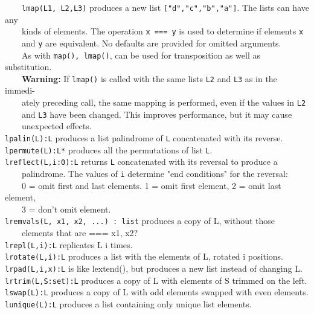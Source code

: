  \ \ \ \ \texttt{lmap(L1, L2,L3)} produces a new list
\texttt{["d","c","b","a"]}.
The lists can have any\\
 \ \ \ \ kinds of elements. The operation \texttt{x === y} is used to
determine if elements \texttt{x}\\
 \ \ \ \ and \texttt{y} are equivalent. No defaults are provided for omitted arguments.\\
 \ \ \ \ As
with \texttt{map(), lmap()}, can be used for transposition as well as substitution.\\
 \ \ \ \ \textbf{Warning: }If \texttt{lmap()} is called with
 the same lists \texttt{L2} and \texttt{L3} as in the
immedi-\\
 \ \ \ \ ately preceding call, the same mapping is performed, even if
 the values in \texttt{L2} \\
 \ \ \ \ and \texttt{L3} have been changed. This improves performance,
 but it may cause \\
 \ \ \ \ unexpected effects. \\
\texttt{lpalin(L):L} produces a list palindrome of \texttt{L}
concatenated with its reverse.\\
\texttt{lpermute(L):L*} produces all the permutations of list
\texttt{L}.\\
\texttt{lreflect(L,i:0):L} returns \texttt{L} concatenated with its
reversal to produce a\\
 \ \ \ \ palindrome. The values of \texttt{i} determine
"end conditions" for the reversal:\\
 \ \ \ \ 0 = omit first and last elements. 1 = omit first element, 2 =
omit last element,\\
 \ \ \ \ 3 = don't omit element.\\
\texttt{lremvals(L, x1, x2, ...) : list} produces a copy of L, without
those\\
 \ \ \ \ elements that are === x1, x2?\\
\texttt{lrepl(L,i):L} replicates L i
times.\\
\texttt{lrotate(L,i):L} produces a list with the elements of L, rotated i
positions.\\
\texttt{lrpad(L,i,x):L} is like lextend(), but produces a new list instead of
changing L.\\
\texttt{lrtrim(L,S:set):L} produces a copy of L with elements of S trimmed on
 the left.\\
\texttt{lswap(L):L} produces a copy of L with odd elements swapped with even
elements.\\
\texttt{lunique(L):L} produces a list containing only unique list elements.

